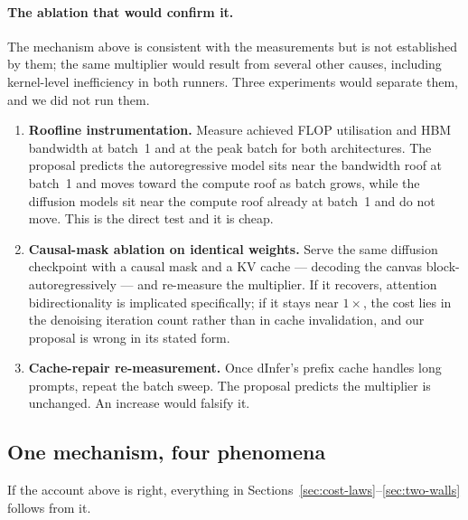 \paragraph{The ablation that would confirm it.}
The mechanism above is consistent with the measurements but is not established
by them; the same multiplier would result from several other causes, including
kernel-level inefficiency in both runners. Three experiments would separate
them, and we did not run them.
\begin{enumerate}
  \item \textbf{Roofline instrumentation.} Measure achieved FLOP utilisation and
    HBM bandwidth at batch~1 and at the peak batch for both architectures. The
    proposal predicts the autoregressive model sits near the bandwidth roof at
    batch~1 and moves toward the compute roof as batch grows, while the
    diffusion models sit near the compute roof already at batch~1 and do not
    move. This is the direct test and it is cheap.
  \item \textbf{Causal-mask ablation on identical weights.} Serve the same
    diffusion checkpoint with a causal mask and a KV cache --- decoding the
    canvas block-autoregressively --- and re-measure the multiplier. If it
    recovers, attention bidirectionality is implicated specifically; if it stays
    near $1\times$, the cost lies in the denoising iteration count rather than in
    cache invalidation, and our proposal is wrong in its stated form.
  \item \textbf{Cache-repair re-measurement.} Once dInfer's prefix cache handles
    long prompts, repeat the batch sweep. The proposal predicts the multiplier
    is unchanged. An increase would falsify it.
\end{enumerate}

\subsection{One mechanism, four phenomena}
\label{sec:mechanism:unification}

If the account above is right, everything in
Sections~\ref{sec:cost-laws}--\ref{sec:two-walls} follows from it.

